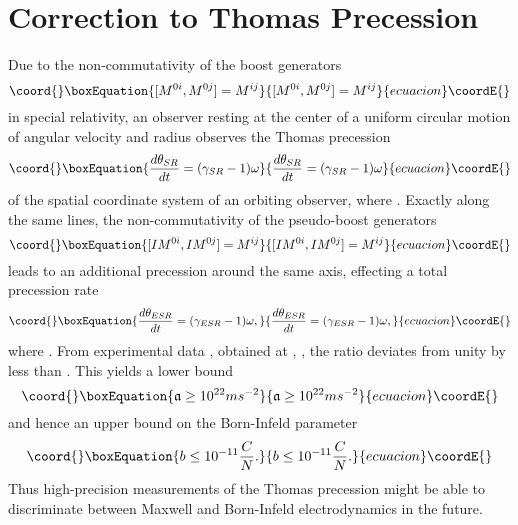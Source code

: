 \documentclass[11pt,a4paper,twoside]{article}
\begin{document}
\section{Correction to Thomas Precession\label{sec_thomas}}
Due to the non-commutativity of the boost generators
\begin{equation}\coord{}\boxEquation{
  [M^{0i},M^{0j}] = M^{ij}
}{
  [M^{0i},M^{0j}] = M^{ij}
}{ecuacion}\coordE{}\end{equation}
in special relativity,
an observer resting at the center of a uniform circular motion of
angular velocity \myHighlight{$\omega$}\coordHE{} and radius \coordHE{} observes the Thomas precession \cite{Thomas}
\begin{equation}\coord{}\boxEquation{
  \frac{d\theta_{SR}}{dt} = (\gamma_{SR}-1)\omega
}{
  \frac{d\theta_{SR}}{dt} = (\gamma_{SR}-1)\omega
}{ecuacion}\coordE{}\end{equation}
of the spatial coordinate system of an orbiting observer, where
\coordHE{}.
Exactly along the same lines, the non-commutativity of the
pseudo-boost generators
\begin{equation}\coord{}\boxEquation{
  [I M^{0i},I M^{0j}] = M^{ij}
}{
  [I M^{0i},I M^{0j}] = M^{ij}
}{ecuacion}\coordE{}\end{equation}
leads to an additional precession around the same axis, effecting a
total precession rate
\begin{equation}\coord{}\boxEquation{
 \frac{d\theta_{ESR}}{dt} = (\gamma_{ESR}-1)\omega,
}{
 \frac{d\theta_{ESR}}{dt} = (\gamma_{ESR}-1)\omega,
}{ecuacion}\coordE{}\end{equation}
where \coordHE{}. From
experimental data \cite{Newman}, obtained at
\coordHE{}, \coordHE{}, the ratio
\coordHE{} deviates from unity by less
than \coordHE{}. This yields a lower bound
\begin{equation}\coord{}\boxEquation{
  \mathfrak{a} \geq 10^{22} ms^{-2}
}{
  \mathfrak{a} \geq 10^{22} ms^{-2}
}{ecuacion}\coordE{}\end{equation}
and hence an upper bound on the Born-Infeld parameter
\begin{equation}\coord{}\boxEquation{
  b \leq 10^{-11} \frac{C}{N}.
}{
  b \leq 10^{-11} \frac{C}{N}.
}{ecuacion}\coordE{}\end{equation}
Thus high-precision measurements of the Thomas precession might be
able to discriminate between Maxwell and Born-Infeld electrodynamics in
the future.
\end{document}
